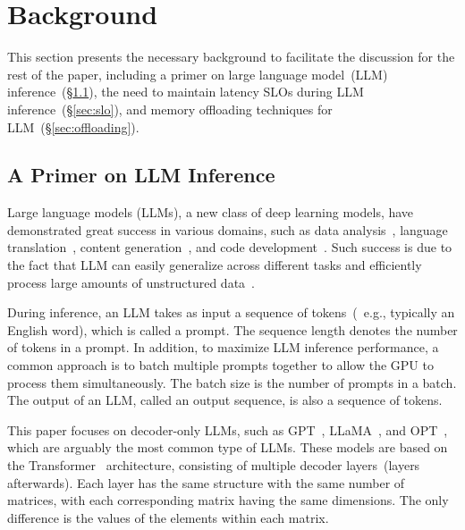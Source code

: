 \section{Background}

This section presents the necessary background to facilitate the discussion for the rest of the paper, 
including a primer on large language model~(LLM) inference~(\S\ref{sec:llm}), 
the need to maintain latency SLOs during LLM inference~(\S\ref{sec:slo}), 
and memory offloading techniques for LLM~(\S\ref{sec:offloading}).

\subsection{A Primer on LLM Inference}
\label{sec:llm}
%
Large language models (LLMs), a new class of deep learning models, have demonstrated great success in various domains, 
such as data analysis~\cite{dataanalyse1, dataanalyse2, dataanalyse3},  
language translation~\cite{translation1, translation2, translation3}, 
content generation~\cite{content1, content2, content3}, and 
code development~\cite{code1, code2, code3, code4}. 
%
Such success is due to the fact that LLM can easily generalize across different 
tasks and efficiently process large amounts of unstructured data~\cite{Unstructured1}. 
%

During inference, an LLM takes as input a sequence of tokens~(\,  e.g., typically an English word), which is called a prompt. 
%
The sequence length denotes the number of tokens in a prompt. 
%
In addition, to maximize LLM inference performance, a common approach is to batch multiple prompts together to allow the GPU to process them simultaneously. 
%
The batch size is the number of prompts in a batch. 
%
The output of an LLM, called an output sequence, is also a sequence of tokens. 
%

This paper focuses on decoder-only LLMs, such as GPT~\cite{gpt}, LLaMA~\cite{llama}, and OPT~\cite{opt}, which are arguably the most common type of LLMs. 
%
These models are based on the Transformer~\cite{transformer} architecture, 
consisting of multiple decoder layers~(layers afterwards).  
%
Each layer has the same structure with the same number of matrices, with each corresponding matrix having the same dimensions. 
%
The only difference is the values of the elements within each matrix.

